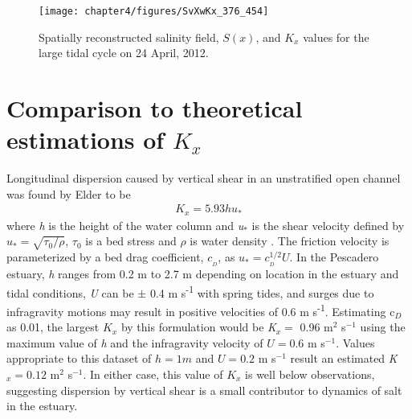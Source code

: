\begin{figure}[hp]
\centering
	\texttt{[image: chapter4/figures/SvXwKx\_376\_454]} 
\caption{Spatially reconstructed salinity field, $S(x)$, and $K_x$ values for the large tidal cycle on 24 April, 2012.} \label{fig:Kx424}
\end{figure}




\section{Comparison to theoretical estimations of $K_x$}

Longitudinal dispersion caused by vertical shear in an unstratified open channel was found by Elder to be
\begin{eqnarray}
K_x = 5.93hu_* \label{eq:Kvertshear}
\end{eqnarray}
where \emph{h} is the height of the water column and \emph{u$_*$} is the shear velocity defined by $u_*=\sqrt{\tau_0/\rho}$, $\tau_0$ is a bed stress and $\rho$ is water density \parencite*{elder_dispersion_1959}. The friction velocity is parameterized by a bed drag coefficient, $c_{_D}$, as $u_* = c_{_D}^{1/2}U$. In the Pescadero estuary, \emph{h} ranges from 0.2 m to 2.7 m depending on location in the estuary and tidal conditions, \emph{U} can be $\pm$ 0.4 m s\textsuperscript{-1} with spring tides, and surges due to infragravity motions may result in positive velocities of 0.6 m s\textsuperscript{-1}. Estimating c$_D$ as 0.01, the largest $K_x$ by this formulation would be \emph{K}$_x =$ 0.96 m$^2$ s$^{-1}$ using the maximum value of \emph{h} and the infragravity velocity of $U = 0.6$ m s$^{-1}$. Values appropriate to this dataset of $h = 1 m$ and $U = 0.2$ m s$^{-1}$ result an estimated \emph{K}$_x = 0.12$ m$^2$ s$^{-1}$. In either case, this value of $K_x$ is well below observations, suggesting dispersion by vertical shear is a small contributor to dynamics of salt in the estuary.

